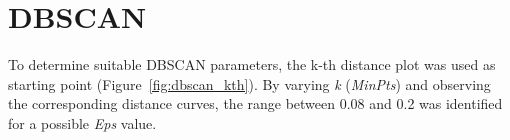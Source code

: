 


\section{DBSCAN}\label{sec:density_based}
To determine suitable DBSCAN parameters, the k-th distance plot was used as starting point (Figure~\ref{fig:dbscan_kth}). 
By varying \textit{k} (\textit{MinPts}) and observing the corresponding distance curves, the range between 0.08 and 0.2 was identified for a possible \textit{Eps} value.
